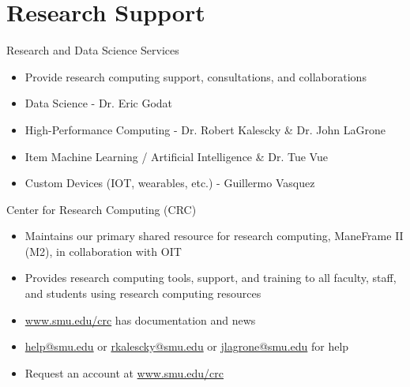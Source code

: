 \section{Research Support}

\begin{frame}{Research and Data Science Services}
\begin{itemize}
  \item Provide research computing support, consultations, and collaborations
  \item Data Science - Dr. Eric Godat
  \item High-Performance Computing - Dr. Robert Kalescky \& Dr. John LaGrone
  \item Item Machine Learning / Artificial Intelligence \& Dr. Tue Vue
  \item Custom Devices (IOT, wearables, etc.) - Guillermo Vasquez
\end{itemize}
\end{frame}

\begin{frame}{Center for Research Computing (CRC)}
\begin{itemize}
  \item Maintains our primary shared resource for research computing, ManeFrame II (M2), in collaboration with OIT
  \item Provides research computing tools, support, and training to all faculty, staff, and students using research computing resources
  \item \url{www.smu.edu/crc} has documentation and news
  \item \href{mailto:help@smu.edu}{help@smu.edu} or \href{mailto:rkalescky@smu.edu}{rkalescky@smu.edu} or \href{mailto:jlagrone@smu.edu}{jlagrone@smu.edu} for help
  \item Request an account at \url{www.smu.edu/crc}
\end{itemize}
\end{frame}

